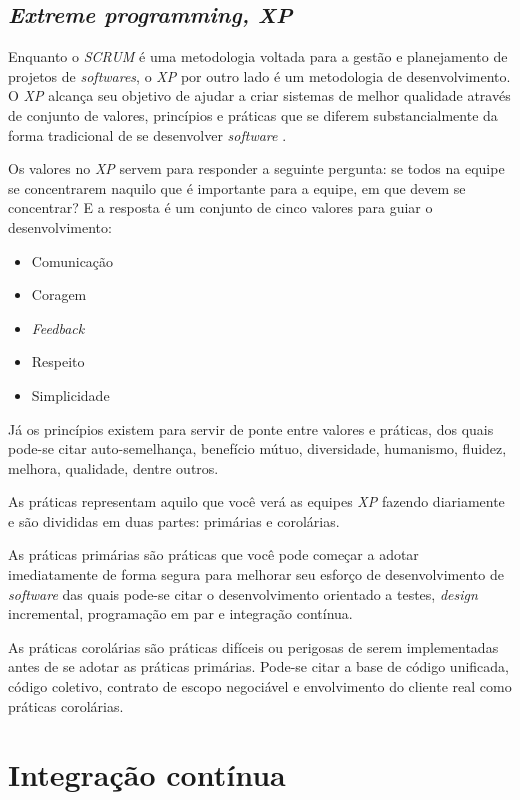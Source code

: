 \documentclass[
	12pt,				%
	openright,			%
	oneside,			%
	a4paper,			%
	english,			%
	french,				%
	spanish,			%
	brazil,				%
	]{abntex2}
\begin{document}
\subsection{\textit{Extreme programming, XP}}

Enquanto o \textit{SCRUM} é uma metodologia voltada para a gestão e planejamento de projetos de \textit{softwares}, o \textit{XP} por outro lado é um metodologia de desenvolvimento. O \textit{XP} alcança seu objetivo de ajudar a criar sistemas de melhor qualidade através de conjunto de valores, princípios e práticas que se diferem substancialmente da forma tradicional de se desenvolver \textit{software} \cite{Agil:XP}.

Os valores no \textit{XP} servem para responder a seguinte pergunta: se todos na equipe se concentrarem naquilo que é importante para a equipe, em que devem se concentrar? E a resposta é um conjunto de cinco valores para guiar o desenvolvimento:

\begin{itemize}
	\item Comunicação
	\item Coragem
	\item \textit{Feedback}
	\item Respeito
	\item Simplicidade
\end{itemize}

Já os princípios existem para servir de ponte entre valores e práticas, dos quais pode-se citar auto-semelhança, benefício mútuo, diversidade, humanismo, fluidez, melhora, qualidade, dentre outros.

As práticas representam aquilo que você verá as equipes \textit{XP} fazendo diariamente e são divididas em duas partes: primárias e corolárias. 

As práticas primárias são práticas que você pode começar a adotar imediatamente de forma segura para melhorar seu esforço de desenvolvimento de \textit{software} das quais pode-se citar o desenvolvimento orientado a testes, \textit{design} incremental, programação em par e integração contínua.

As práticas corolárias são práticas difíceis ou perigosas de serem implementadas antes de se adotar as práticas primárias. Pode-se citar a base de código unificada, código coletivo, contrato de escopo negociável e envolvimento do cliente real como práticas corolárias.

\section{Integração contínua}
\end{document}
